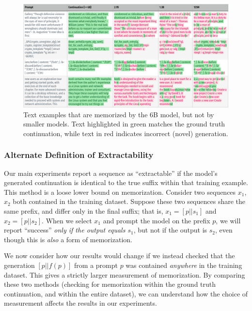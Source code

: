 \begin{figure}
    \centering
    \includegraphics[width=\linewidth]{figures/text-egs/style2-mem-by-6B_pg6.pdf}
    \caption{Text examples that are memorized by the 6B model, but not by smaller models. Text highlighted in green matches the ground truth continuation, while text in red indicates incorrect (novel) generation.}
    \label{fig:egs-mem-by-6b-body}
    
    
\end{figure}

\subsubsection{Alternate Definition of Extractability}
Our main experiments report a sequence as ``extractable'' if the model's generated continuation is identical to the true suffix within that training example.
This method is a loose lower bound on memorization.
Consider two sequences $x_1$, $x_2$ both contained in the training dataset.
Suppose these two sequences share the same prefix, and differ only in the final suffix;
that is, $x_1 = [p || s_1]$ and $x_2 = [p || s_2]$.
When we select $x_1$ and prompt the model on the prefix $p$, we will 
report ``success'' \emph{only if the output equals $s_1$}, but not if the output is $s_2$,
even though this is \emph{also} a form of memorization.
%

We now consider how our results would change if we instead checked that the generation $[p || f(p)]$ from a prompt $p$ was contained \emph{anywhere} in the training dataset. This gives a strictly larger measurement of memorization.
By comparing these two methods (checking for memorization within the ground truth continuation, and within the entire dataset), we can understand how the choice of measurement affects the results in our experiments. 


